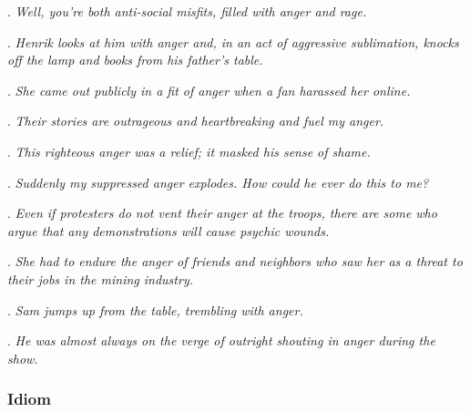 \ex. \textit{Well, you're both anti-social misfits, filled with anger and rage.}

\ex. \textit{Henrik looks at him with anger and, in an act of aggressive sublimation, knocks off the lamp and books from his father's table.}

\ex. \textit{She came out publicly in a fit of anger when a fan harassed her online.}


\ex. \textit{Their stories are outrageous and heartbreaking and fuel my anger.}

\ex. \textit{This righteous anger was a relief; it masked his sense of shame.}

\ex. \textit{Suddenly my suppressed anger explodes. How could he ever do this to me?}

\ex. \textit{Even if protesters do not vent their anger at the troops, there are some who argue that any demonstrations will cause psychic wounds.}

\ex. \textit{She had to endure the anger of friends and neighbors who saw her as a threat to their jobs in the mining industry.}

\ex. \textit{Sam jumps up from the table, trembling with anger.}

\ex. \textit{He was almost always on the verge of outright shouting in anger during the show.}

\endgroup

\subsubsection*{Idiom}\label{sec:AppendixIdiom}

\noindent
{}


\clearpage{\pagestyle{empty}\cleardoublepage}

